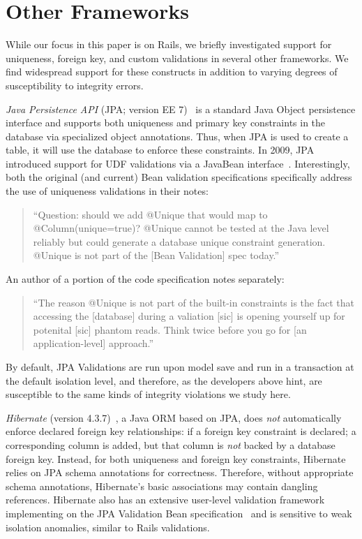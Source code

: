 
\section{Other Frameworks}
\label{sec:other-orms}

While our focus in this paper is on Rails, we briefly investigated
support for uniqueness, foreign key, and custom validations in several
other frameworks. We find widespread support for these constructs in
addition to varying degrees of susceptibility to integrity errors.

\newcommand{\orm}[1]{{\vspace{.45em}\noindent\textit{#1}}}

\orm{Java Persistence API} (JPA; version EE 7)~\cite{code-jpa} is a
standard Java Object persistence interface and supports both
uniqueness and primary key constraints in the database via specialized
object annotations. Thus, when JPA is used to create a table, it will
use the database to enforce these constraints. In 2009, JPA introduced
support for UDF validations via a JavaBean
interface~\cite{code-bean-validation}. Interestingly, both the
original (and current) Bean validation specifications specifically
address the use of uniqueness validations in their notes:
\begin{quote}
``Question: should we add @Unique that would map to @Column(unique=true)?
@Unique cannot be tested at the Java level reliably but could generate
a database unique constraint generation. @Unique is not part
of the [Bean Validation] spec today.''~\cite{jsr-bean}
\end{quote}
An author of a portion of the code specification notes separately:
\begin{quote}
  ``The reason @Unique is not part of the built-in constraints is the
  fact that accessing the [database] during a valiation [sic] is
  opening yourself up for potenital [sic] phantom reads. Think twice
  before you go for [an application-level] approach.''~\cite{unique-bean}
\end{quote}
By default, JPA Validations are run upon model save and run in a
transaction at the default isolation level, and therefore, as the
developers above hint, are susceptible to the same kinds of integrity
violations we study here.

\orm{Hibernate} (version 4.3.7)~\cite{code-hibernate}, a Java ORM
based on JPA, does \textit{not} automatically enforce declared foreign
key relationships: if a foreign key constraint is declared; a
corresponding column is added, but that column is \textit{not} backed by a
database foreign key. Instead, for both uniqueness and foreign key
constraints, Hibernate relies on JPA schema annotations for
correctness. Therefore, without appropriate schema annotations,
Hibernate's basic associations may contain dangling references. Hibernate also has an extensive user-level validation
framework implementing on the JPA Validation Bean
specification~\cite{code-hibernate-validator} and is sensitive to weak
isolation anomalies, similar to Rails validations.

